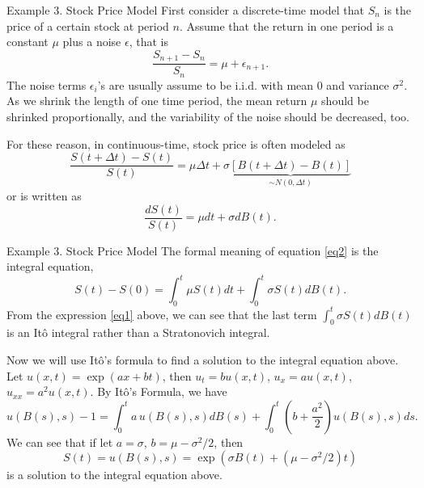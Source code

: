\documentclass[letterpaper,handout]{beamer}
\begin{document}
\begin{frame}{Example 3. Stock Price Model}
First consider a discrete-time model that $S_n$ is the price of a certain stock at period $n$.
Assume that the return in one period is a constant $\mu$ plus a noise $\epsilon$, that is
$$\frac{S_{n+1}-S_n}{S_n}=\mu+\epsilon_{n+1}.$$
The noise terms $\epsilon_{i}$'s are usually assume to be i.i.d. with mean 0 and variance $\sigma^2.$
As we shrink the length of one time period, the mean return $\mu$ should be shrinked proportionally,
and the variability of the noise should be decreased, too.

For these reason, in continuous-time, stock price is often modeled as
\begin{equation}
\frac{S(t+\Delta t)-S(t)}{S(t)}=\mu \Delta t +\sigma \underbrace{[B(t+\Delta t)-B(t)]}_{\sim N(0,\Delta t)}\label{eq1}
\end{equation}
or is written as
\begin{equation}
\frac{dS(t)}{S(t)}=\mu d t +\sigma dB(t).\label{eq2}
\end{equation}

\end{frame}
\begin{frame}{Example 3. Stock Price Model}
The formal meaning of equation \eqref{eq2} is the integral equation,
$$S(t)-S(0)=\int_0^t \mu S(t)d t+ \int_0^t\sigma S(t) dB(t).$$
From the expression \eqref{eq1} above, we can see that the last term $\int_0^t\sigma S(t) dB(t)$ is an It\^{o} integral rather than a Stratonovich integral.

Now we will use It\^{o}'s formula to find a solution to the integral equation above.
Let $u(x,t) = \exp(ax + bt)$, then $u_t=b u(x,t)$, $u_x=a u(x,t)$, $u_{xx}=a^2u(x,t).$ By It\^{o}'s Formula, we have
$$
u(B(s),s) - 1=\int_0^t a\, u(B(s),s)d B(s)+\int_0^t (b+\frac{a^2}{2}) u(B(s),s)d s.
$$
We can see that if let $a=\sigma$, $b=\mu-\sigma^2/2$, then
$$S(t)=u(B(s),s)=\exp(\sigma B(t)+ (\mu-\sigma^2/2)t)$$
is a solution to the integral equation above.
\end{frame}
\end{document}
